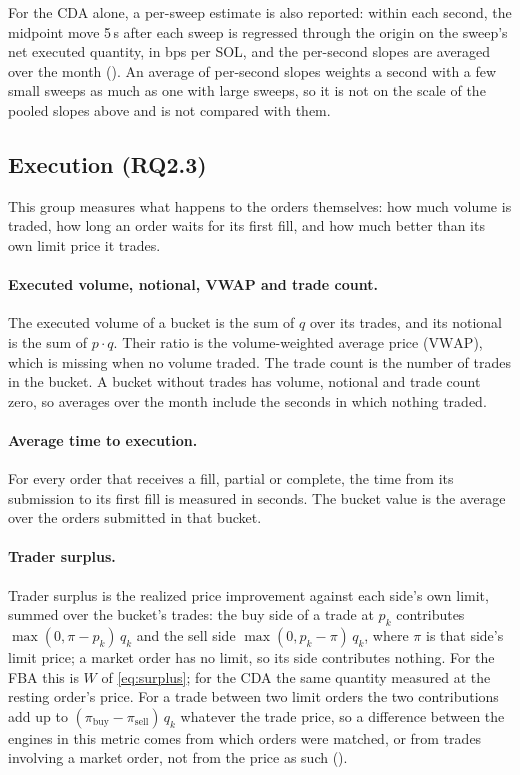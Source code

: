 For the CDA alone, a per-sweep estimate is also reported: within each
second, the midpoint move 5\,s after each sweep is regressed through the
origin on the sweep's net executed quantity, in bps per SOL, and the
per-second slopes are averaged over the month (). An
average of per-second slopes weights a second with a few small sweeps as
much as one with large sweeps, so it is not on the scale of the pooled
slopes above and is not compared with them.

\subsection{Execution (RQ2.3)}
\label{sec:metrics23}

This group measures what happens to the orders themselves: how much
volume is traded, how long an order waits for its first fill, and how much
better than its own limit price it trades.

\paragraph{Executed volume, notional, VWAP and trade count.} The executed
volume of a bucket is the sum of $q$ over its trades, and its notional is
the sum of $p \cdot q$. Their ratio is the volume-weighted average price
($\mathrm{VWAP}$), which is missing when no volume traded. The trade count
is the number of trades in the bucket. A bucket without trades has volume,
notional and trade count zero, so averages over the month include the
seconds in which nothing traded.

\paragraph{Average time to execution.} For every order that receives a
fill, partial or complete, the time from its submission to its first fill
is measured in seconds. The bucket value is the average over the orders
submitted in that bucket.

\paragraph{Trader surplus.} Trader surplus is the realized price
improvement against each side's own limit, summed over the bucket's
trades: the buy side of a
trade at $p_k$ contributes $\max(0, \pi - p_k)\,q_k$ and the sell side
$\max(0, p_k - \pi)\,q_k$, where $\pi$ is that side's limit price; a market
order has no limit, so its side contributes nothing. For the FBA this is
$W$ of \eqref{eq:surplus}; for the CDA the same quantity measured at the
resting order's price. For a trade between two limit orders the two
contributions add up to $(\pi_{\text{buy}} - \pi_{\text{sell}})\,q_k$
whatever the trade price, so a difference between the engines in this
metric comes from which orders were matched, or from trades involving a
market order, not from the price as such ().

